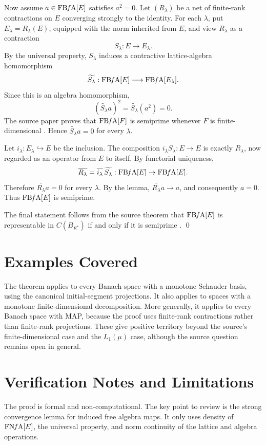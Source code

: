 \documentclass[11pt]{article}
\newcommand{\FBFA}[1]{\operatorname{FB{\it f}A}[#1]}
\newcommand{\FNFA}[1]{\operatorname{FN{\it f}A}[#1]}
\begin{document}
Now assume \(a\in\FBFA{E}\) satisfies \(a^2=0\).  Let
\((R_\lambda)\) be a net of finite-rank contractions on \(E\) converging
strongly to the identity.  For each \(\lambda\), put
\(E_\lambda=R_\lambda(E)\), equipped with the norm inherited from \(E\),
and view \(R_\lambda\) as a contraction
\[
S_\lambda:E\longrightarrow E_\lambda .
\]
By the universal property, \(S_\lambda\) induces a contractive
lattice-algebra homomorphism
\[
\widetilde{S_\lambda}:\FBFA{E}\longrightarrow \FBFA{E_\lambda}.
\]
Since this is an algebra homomorphism,
\[
(\widetilde{S_\lambda}a)^2
=
\widetilde{S_\lambda}(a^2)
=0.
\]
The source paper proves that \(\FBFA{F}\) is semiprime whenever \(F\) is
finite-dimensional \cite[Corollary 4.23]{munoz-tradacete}.  Hence
\(\widetilde{S_\lambda}a=0\) for every \(\lambda\).

Let \(i_\lambda:E_\lambda\hookrightarrow E\) be the inclusion.  The
composition \(i_\lambda S_\lambda:E\to E\) is exactly \(R_\lambda\), now
regarded as an operator from \(E\) to itself.  By functorial uniqueness,
\[
\overline{R_\lambda}
=
\overline{i_\lambda}\,\widetilde{S_\lambda}
:\FBFA{E}\to\FBFA{E}.
\]
Therefore \(\overline{R_\lambda}a=0\) for every \(\lambda\).  By the
lemma, \(\overline{R_\lambda}a\to a\), and consequently \(a=0\).
Thus \(\FBFA{E}\) is semiprime.

The final statement follows from the source theorem that
\(\FBFA{E}\) is representable in \(C(B_{E^*})\) if and only if it is
semiprime \cite[Theorem 5.1]{munoz-tradacete}.
\qed

\section*{Examples Covered}

The theorem applies to every Banach space with a monotone Schauder
basis, using the canonical initial-segment projections.  It also applies
to spaces with a monotone finite-dimensional decomposition.  More
generally, it applies to every Banach space with MAP, because the proof
uses finite-rank contractions rather than finite-rank projections.  These
give positive territory beyond the source's finite-dimensional case and
the \(L_1(\mu)\) case, although the source question remains open in
general.

\section*{Verification Notes and Limitations}

The proof is formal and non-computational.  The key point to review is
the strong convergence lemma for induced free algebra maps.  It only
uses density of \(\FNFA{E}\), the universal property, and norm continuity
of the lattice and algebra operations.
\end{document}
